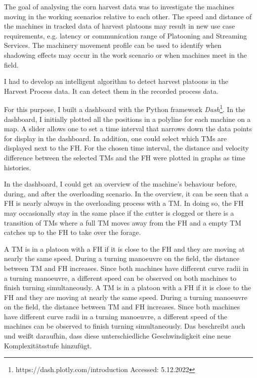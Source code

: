 The goal of analysing the corn harvest data was to investigate the machines moving in the working scenarios relative to each other. The speed and distance of the machines in tracked data of harvest platoons may result in new use case requirements, e.g. latency or communication range of Platooning and Streaming Services. The machinery movement profile can be used to identify when shadowing effects may occur in the work scenario or when machines meet in the field.

I had to develop an intelligent algorithm to detect harvest platoons in the Harvest Process data. It can detect them in the recorded process data.

For this purpose, I built a dashboard with the Python framework \textit{Dash}\footnote{https://dash.plotly.com/introduction Accessed: 5.12.2022}. In the dashboard, I initially plotted all the positions in a polyline for each machine
on a map. A slider allows one to set a time interval that narrows down the data
points for display in the dashboard. In addition, one could select which \ac{TM}s are displayed next to the \ac{FH}. For the chosen time interval, the distance and velocity difference between the selected \ac{TM}s and the \ac{FH} were plotted in graphs as time histories. 

In the dashboard, I could get an overview of the machine's behaviour 
before, during, and after the overloading scenario.
In the overview, it can be seen that a \ac{FH} is nearly always in the overloading process with a \ac{TM}. In doing so, the \ac{FH} may occasionally stay in the same place if the cutter is clogged or there is a transition of \ac{TM}s where a full \ac{TM} moves away from the \ac{FH} and  a  empty \ac{TM} catches up to the \ac{FH} to take over the forage.

A \ac{TM} is in a platoon with a  \ac{FH} if it is close to the \ac{FH} and they are moving at nearly the same speed. During a turning manoeuvre on the field, the distance between \ac{TM} and \ac{FH} increases. Since both machines have different curve radii in a turning manoeuvre, a different speed can be observed on both machines to finish turning simultaneously.
A \ac{TM} is in a platoon with a  \ac{FH} if it is close to the \ac{FH} and they are moving at nearly the same speed. During a turning manoeuvre on the field, the distance between \ac{TM} and \ac{FH} increases. Since both machines have different curve radii in a turning manoeuvre, a different speed of the machines can be observed to finish turning simultaneously.
Das beschreibt auch \textcite{IVAN} und weißt daraufhin, dass diese unterschiedliche Geschwindigkeit eine neue Komplexitätsstufe hinzufügt.

